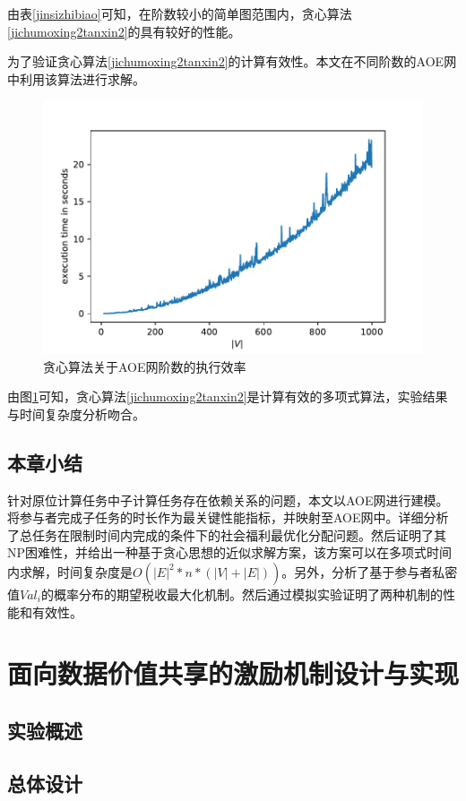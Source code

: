 \documentclass[promaster]{thesis-uestc}
\begin{document}
由表\ref{jinsizhibiao}可知，在阶数较小的简单图范围内，贪心算法\ref{jichumoxing2tanxin2}的具有较好的性能。

为了验证贪心算法\ref{jichumoxing2tanxin2}的计算有效性。本文在不同阶数的AOE网中利用该算法进行求解。

\begin{figure}[h]
    \includegraphics{exp/exetime.pdf}
    \caption{贪心算法关于AOE网阶数的执行效率}
    \label{exetime}
\end{figure}
由图\ref{exetime}可知，贪心算法\ref{jichumoxing2tanxin2}是计算有效的多项式算法，实验结果与时间复杂度分析吻合。

\section{本章小结}
针对原位计算任务中子计算任务存在依赖关系的问题，本文以AOE网进行建模。将参与者完成子任务的时长作为最关键性能指标，并映射至AOE网中。详细分析了总任务在限制时间内完成的条件下的社会福利最优化分配问题。然后证明了其NP困难性，并给出一种基于贪心思想的近似求解方案，该方案可以在多项式时间内求解，时间复杂度是$O(|E|^2*n*(|V|+|E|))$。另外，分析了基于参与者私密值$Val_i$的概率分布的期望税收最大化机制。然后通过模拟实验证明了两种机制的性能和有效性。


\chapter{面向数据价值共享的激励机制设计与实现}
\section{实验概述}

\section{总体设计}
\end{document}
